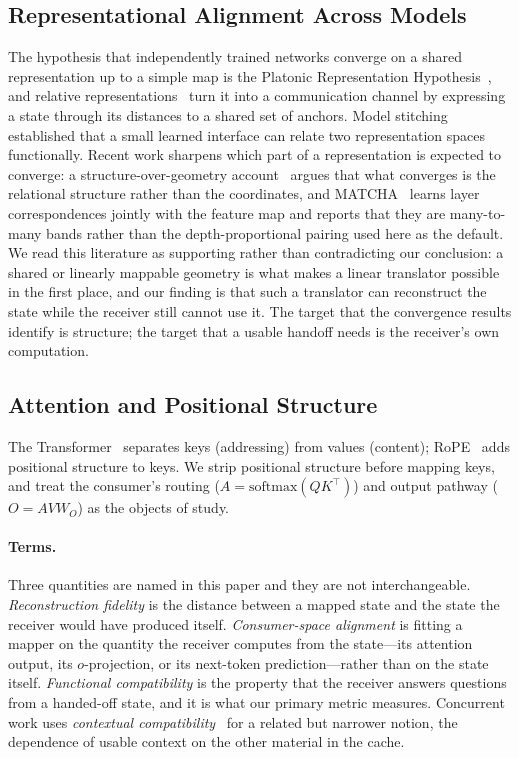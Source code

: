 \documentclass[11pt]{article}
\begin{document}
\subsection{Representational Alignment Across Models}
\label{sec:rw-align}
The hypothesis that independently trained networks converge on a shared
representation up to a simple map is the Platonic Representation
Hypothesis~\cite{prh2024}, and relative representations~\cite{relrepr2022} turn it
into a communication channel by expressing a state through its distances to a
shared set of anchors.
Model stitching~\cite{bansal2021stitching} established that a small learned
interface can relate two representation spaces functionally.
Recent work sharpens which part of a representation is expected to converge: a
structure-over-geometry account~\cite{structuregeo2026} argues that what converges
is the relational structure rather than the coordinates, and
MATCHA~\cite{matcha2026} learns layer correspondences jointly with the feature map
and reports that they are many-to-many bands rather than the depth-proportional
pairing used here as the default.
We read this literature as supporting rather than contradicting our conclusion: a
shared or linearly mappable geometry is what makes a linear translator possible in
the first place, and our finding is that such a translator can reconstruct the
state while the receiver still cannot use it.
The target that the convergence results identify is structure; the target that a
usable handoff needs is the receiver's own computation.

\subsection{Attention and Positional Structure}
\label{sec:rw-attn}
The Transformer~\cite{vaswani2017attention} separates keys (addressing) from
values (content); RoPE~\cite{su2024rope} adds positional structure to keys. We
strip positional structure before mapping keys, and treat the consumer's routing
($A=\mathrm{softmax}(QK^{\top})$) and output pathway ($O=AVW_O$) as the objects
of study.


\paragraph{Terms.}
Three quantities are named in this paper and they are not interchangeable.
\emph{Reconstruction fidelity} is the distance between a mapped state and the
state the receiver would have produced itself.
\emph{Consumer-space alignment} is fitting a mapper on the quantity the receiver
computes from the state---its attention output, its $o$-projection, or its
next-token prediction---rather than on the state itself.
\emph{Functional compatibility} is the property that the receiver answers
questions from a handed-off state, and it is what our primary metric measures.
Concurrent work uses \emph{contextual compatibility}~\cite{repairbudget2026} for a
related but narrower notion, the dependence of usable context on the other
material in the cache.
\end{document}
